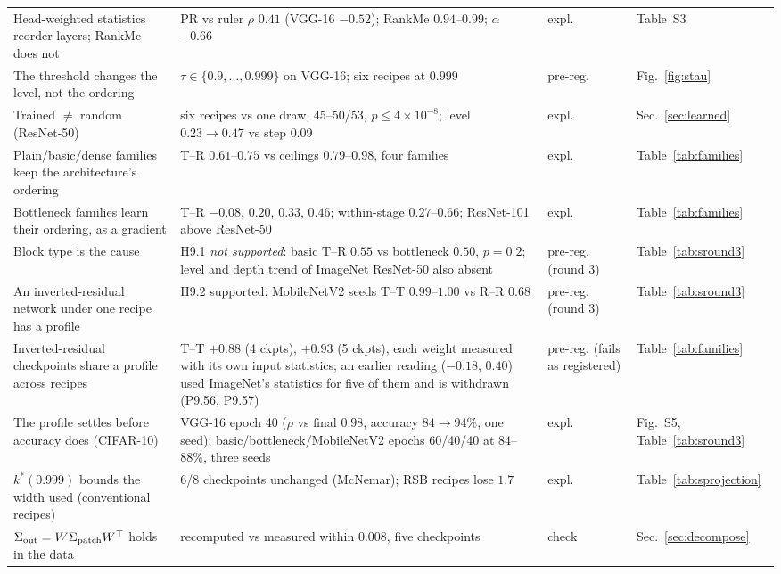\documentclass[10pt,journal,compsoc]{IEEEtran}
\begin{document}
\begin{table}[t]
\begin{tabular}{p{4.3cm}p{5.9cm}lp{2.5cm}}
  Head-weighted statistics reorder layers; RankMe does not & PR vs ruler $\rho$ $0.41$ (VGG-16 $-0.52$); RankMe $0.94$--$0.99$; $\alpha$ $-0.66$ & expl. & Table~S3 \\
  The threshold changes the level, not the ordering & $\tau \in \{0.9, \ldots, 0.999\}$ on VGG-16; six recipes at $0.999$ & pre-reg. & Fig.~\ref{fig:stau} \\
  Trained $\ne$ random (ResNet-50) & six recipes vs one draw, 45--50/53, $p \le 4 \times 10^{-8}$; level $0.23 \to 0.47$ vs step $0.09$ & expl. & Sec.~\ref{sec:learned} \\
  Plain/basic/dense families keep the architecture's ordering & T--R $0.61$--$0.75$ vs ceilings $0.79$--$0.98$, four families & expl. & Table~\ref{tab:families} \\
  Bottleneck families learn their ordering, as a gradient & T--R $-0.08$, $0.20$, $0.33$, $0.46$; within-stage $0.27$--$0.66$; ResNet-101 above ResNet-50 & expl. & Table~\ref{tab:families} \\
  Block type is the cause & H9.1 \emph{not supported}: basic T--R $0.55$ vs bottleneck $0.50$, $p = 0.2$; level and depth trend of ImageNet ResNet-50 also absent & pre-reg. (round 3) & Table~\ref{tab:sround3} \\
  An inverted-residual network under one recipe has a profile & H9.2 supported: MobileNetV2 seeds T--T $0.99$--$1.00$ vs R--R $0.68$ & pre-reg. (round 3) & Table~\ref{tab:sround3} \\
  Inverted-residual checkpoints share a profile across recipes & T--T $+0.88$ (4 ckpts), $+0.93$ (5 ckpts), each weight measured with its own input statistics; an earlier reading ($-0.18$, $0.40$) used ImageNet's statistics for five of them and is withdrawn (P9.56, P9.57) & pre-reg. (fails as registered) & Table~\ref{tab:families} \\
  The profile settles before accuracy does (CIFAR-10) & VGG-16 epoch 40 ($\rho$ vs final $0.98$, accuracy $84 \to 94\%$, one seed); basic/bottleneck/MobileNetV2 epochs 60/40/40 at $84$--$88\%$, three seeds & expl. & Fig.~S5, Table~\ref{tab:sround3} \\
  $k^*(0.999)$ bounds the width used (conventional recipes) & 6/8 checkpoints unchanged (McNemar); RSB recipes lose $1.7$ & expl. & Table~\ref{tab:sprojection} \\
  $\Sigma_{\rm out} = W \Sigma_{\rm patch} W^{\top}$ holds in the data & recomputed vs measured within $0.008$, five checkpoints & check & Sec.~\ref{sec:decompose} \\

\end{tabular}
\end{table}
\end{document}
